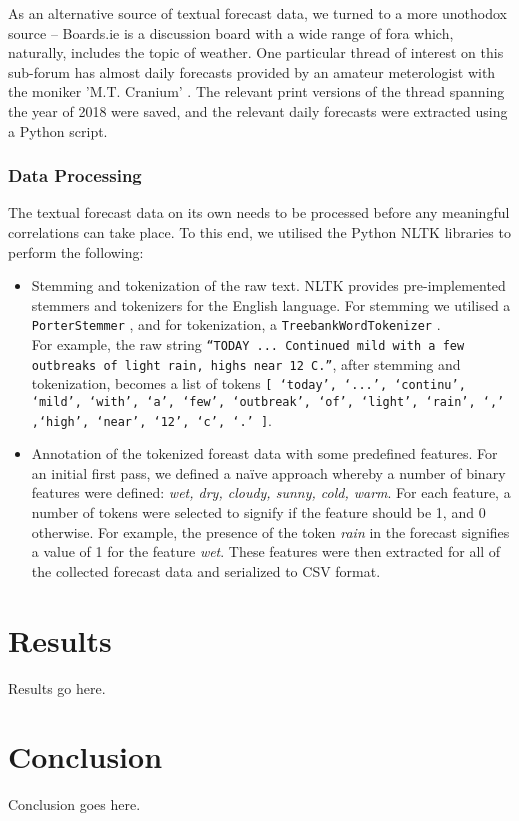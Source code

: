 \documentclass[a4paper,10pt]{article}
\begin{document}
As an alternative source of textual forecast data, we turned to a more unothodox source -- Boards.ie is a discussion board with a wide range of fora which, naturally, includes the topic of weather. One particular thread of interest on this sub-forum has almost daily forecasts provided by an amateur meterologist with the moniker 'M.T. Cranium' . The relevant print versions of the thread spanning the year of 2018 were saved, and the relevant daily forecasts were extracted using a Python script. 

\subsubsection{Data Processing}

The textual forecast data on its own needs to be processed before any meaningful correlations can take place. To this end, we utilised the Python NLTK libraries to perform the following:
\begin{itemize}
    \item{
        Stemming and tokenization of the raw text. NLTK provides pre-implemented stemmers and tokenizers for the English language. For stemming we utilised a \texttt{PorterStemmer} , and for tokenization, a \texttt{TreebankWordTokenizer} . \\ 
        For example, the raw string \texttt{``TODAY ... Continued mild with a few outbreaks of light rain, highs near 12 C.''}, after stemming and tokenization, becomes a list of tokens \texttt{[ `today', `...', `continu', `mild', `with', `a', `few', `outbreak', `of', `light', `rain', `,' ,`high', `near', `12', `c', `.' ]}.
    }
    \item{
        Annotation of the tokenized foreast data with some predefined features. For an initial first pass, we defined a na\"{i}ve approach whereby a number of binary features were defined: \textit{wet, dry, cloudy, sunny, cold, warm}. For each feature, a number of tokens were selected to signify if the feature should be 1, and 0 otherwise. For example, the presence of the token \textit{rain} in the forecast signifies a value of 1 for the feature \textit{wet}. These features were then extracted for all of the collected forecast data and serialized to CSV format.
    }
\end{itemize}

\section{Results}

Results go here.

\section{Conclusion}

Conclusion goes here.
\end{document}
